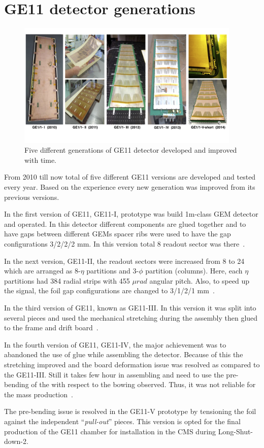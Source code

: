 \chapter{GE11 detector generations} %
\label{cha:ge11_detector_generations}
\begin{figure}[!htbp]
	\centering
	\includegraphics[width=0.95\textwidth]{figures/GEM/5-prototype-generations.jpg}
	\caption{Five different generations of GE11 detector developed and improved with time.}
	\label{fig:GE11generations}
\end{figure}
From 2010 till now total of five different GE11 versions are developed and tested every year. Based on the experience every new generation was improved from its previous versions.

In the first version of GE11, GE11-I, prototype was build 1m-class GEM detector and operated. In this detector different components are glued together and to have gaps between different GEMs spacer ribs were used to have the gap configurations 3/2/2/2 mm. In this version total 8 readout sector was there~\cite{Abbaneo2010}.

In the next version, GE11-II, the readout sectors were increased from 8 to 24 which are arranged as 8-$\eta$ partitions and 3-$\phi$ partition (columns). Here, each $\eta$ partitions had 384 radial strips with 455 $\mu rad$ angular pitch. Also, to speed up the signal, the foil gap configurations are changed to 3/1/2/1 mm~\cite{Abbaneo2011}.

In the third version of GE11, known as GE11-III. In this version it was split into several pieces and used the mechanical stretching during the assembly then glued to the frame and drift board~\cite{Abbaneoo2012}.

In the fourth version of GE11, GE11-IV, the major achievement was to abandoned the use of glue while assembling the detector. Because of this the stretching improved and the board deformation issue was resolved as compared to the GE11-III. Still it takes few hour in assembling and need to use the pre-bending of the with respect to the bowing observed. Thus, it was not reliable for the mass production~\cite{Abbaneo2013}. 

The pre-bending issue is resolved in the GE11-V prototype by tensioning the foil against the independent ``\textit{pull-out}'' pieces. This version is opted for the final production of the GE11 chamber for installation in the CMS during Long-Shut-down-2.

